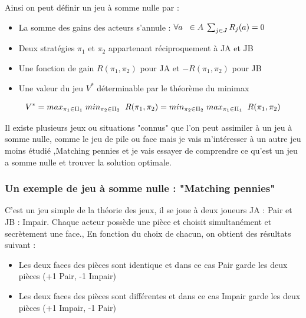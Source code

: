 \documentclass[a4paper, 12pt, twoside]{article}
\begin{document}
{{Ainsi on peut définir un jeu à somme nulle par : 
\begin{itemize}
\item La somme des gains des acteurs s'annule : $\forall a \hspace{0,2 cm} \in A\hspace{0,09 cm} \sum_{j\in J} R_{j}(a) = 0$
\item Deux stratégies $\pi_{1}$ et $\pi_{2}$ appartenant réciproquement à \textsf{\textsf{JA}} et \textsf{\textsf{JB}}
\item Une fonction de gain $R(\pi_{1},\pi_{2})$ pour \textsf{JA} et $-R(\pi_{1},\pi_{2})$ pour \textsf{JB}
\item Une valeur du jeu $V^{*}$ déterminable par le théorème du \textsf{minimax}
\end{itemize}

\begin{align*}
V^{*} = max_{\pi_{1} \in \Pi_{1}}\hspace{0,1cm} min_{\pi_{2} \in \Pi_{2}} \hspace{0,2 cm} R(\pi_{1},\pi_{2}) = min_{\pi_{2} \in \Pi_{2}}\hspace{0,1cm} max_{\pi_{1} \in \Pi_{1}} \hspace{0,2 cm} R(\pi_{1},\pi_{2})
\end{align*}

Il existe plusieurs jeux ou situations "connus" que l'on peut assimiler à un \textsf{jeu à somme nulle}, comme le jeu de \textsf{pile ou face} mais je vais m'intéresser  à un autre jeu  moins étudié ,\textsf{Matching pennies} et je vais essayer de comprendre ce qu'est un \textsf{jeu a somme nulle} et trouver la solution optimale.

\subsubsection{Un exemple de jeu à somme nulle  :  "Matching pennies"}
C'est un jeu simple de la théorie des jeux, il se joue à deux joueurs \textsf{JA} : \textsf{Pair}  et \textsf{JB} : \textsf{Impair}. Chaque acteur possède une pièce et choisit simultanément et secrètement une face., En fonction du choix de chacun, on obtient des résultats suivant :

\begin{itemize}
\item Les deux faces des pièces sont identique et dans ce cas Pair garde les deux pièces (+1 Pair, -1 Impair)
\item Les deux faces des pièces sont différentes et dans ce cas Impair garde les deux pièces (+1 Impair, -1 Pair)
\end{itemize}  \vspace{0.2 cm}

}}
\end{document}
